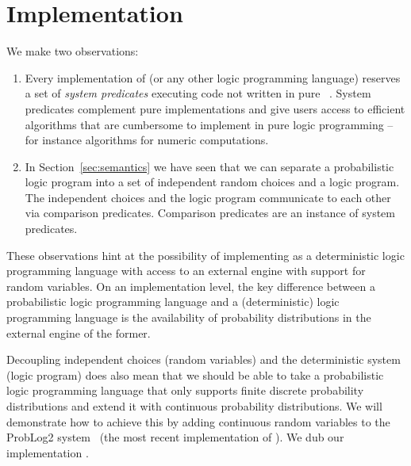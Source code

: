 \section{Implementation} \label{sec:implementation}
We make two observations:
\begin{enumerate}
    \item Every implementation of \prologsty  (or any other logic programming language)  reserves a set of {\em  system predicates} executing code not written in pure \prologsty~\citep[Chapter 8]{sterling1994art}.
    System predicates complement pure \prologsty implementations and give users access to efficient algorithms that are cumbersome to implement in pure logic programming -- for instance algorithms for numeric computations.
    \item In Section~\ref{sec:semantics} we have seen that we can separate a probabilistic logic program into a set of independent random choices and a logic program. The independent choices and the logic program communicate to each other via comparison predicates. Comparison predicates are an instance of system predicates.
\end{enumerate}

These observations hint at the possibility of implementing \dcproblogsty as a deterministic logic programming language with access to an external engine with support for random variables.
On an implementation level, the key difference between a probabilistic logic programming language and a (deterministic) logic programming language is the availability of probability distributions in the external engine of the former.

Decoupling independent choices (random variables) and the deterministic system (logic program) does also mean that we should be able to take a probabilistic logic programming language that only supports finite discrete probability distributions and extend it with continuous probability distributions.
We will demonstrate how to achieve this by adding continuous random variables to the ProbLog2 system~\citep{dries2015problog2} (the most recent implementation of \problogsty). We dub our implementation \dcproblogsys.









